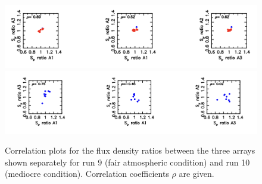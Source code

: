 \begin{figure}
\begin{center}                                                                                                             \includegraphics[clip, angle=0, scale=0.55]{Figures/Corr_r9.png}
  \includegraphics[clip, angle=0, scale=0.55]{Figures/Corr_r10.png}  
  \caption{Correlation plots for the flux density ratios between  the three arrays
    shown separately for run 9 (fair atmospheric condition) and run 10 (mediocre condition).
    Correlation coefficients $\rho$ are given.}
\label{fig:U_N_corr}
\end{center}                                                                                                             \end{figure}


